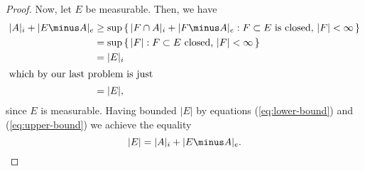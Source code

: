 \begin{proof}
Now, let $E$ be measurable. Then, we have
\begin{align}
\label{eq:upper-bound}
|A|_i+|E\minus A|_e
&\geq\sup\left\{\,|F\cap A|_i+|F\minus A|_e:\text{$F\subset E$ is closed, $|F|<\infty$}\,\right\}\nonumber\\
&=\sup\left\{\,|F|:\text{$F\subset E$ closed, $|F|<\infty$}\,\right\}\nonumber\\
&=|E|_i\nonumber\\
\intertext{which by our last problem is just}
&=|E|,
\end{align}
since $E$ is measurable. Having bounded $|E|$ by equations
(\ref{eq:lower-bound}) and (\ref{eq:upper-bound}) we achieve the equality
\[
|E|=|A|_i+|E\minus A|_e.\qedhere
\]
\end{proof}


